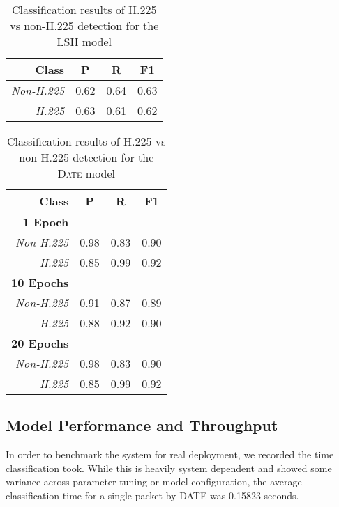 \begin{table} [h!]
\centering
\begin{tabular}{| r | c | c | c |}
\hline
Class & P & R & F1 \\
\hline
\textit{Non-H.225} & 0.62 & 0.64 & 0.63 \\
\textit{H.225} & 0.63 & 0.61 & 0.62 \\
\hline
\end{tabular}
\caption{Classification results of H.225 vs non-H.225 detection for the LSH model}
\label{tab:h225resultslsh}
\end{table}


\begin{table} [h!]
\centering
\begin{tabular}{| r | c | c | c |}
\hline
Class & P & R & F1 \\
\hline
\textbf{1 Epoch} &&& \\
\textit{Non-H.225} & 0.98 & 0.83 & 0.90 \\
\textit{H.225} & 0.85 & 0.99 & 0.92 \\
\hline
\textbf{10 Epochs} &&& \\
\textit{Non-H.225} & 0.91 & 0.87 & 0.89 \\
\textit{H.225} & 0.88 & 0.92 & 0.90 \\
\hline
\textbf{20 Epochs} &&& \\
\textit{Non-H.225} & 0.98 & 0.83 & 0.90 \\
\textit{H.225} & 0.85 & 0.99 & 0.92 \\
\hline
\end{tabular}
\caption{Classification results of H.225 vs non-H.225 detection for the \textsc{Date} model}
\label{tab:h225results}
\end{table}

\subsection{Model Performance and Throughput}
In order to benchmark the system for real deployment, we recorded the time classification took. While this is heavily system dependent and showed some variance across parameter tuning or model configuration, the average classification time for a single packet by \textsc{DATE} was 0.15823 seconds.
